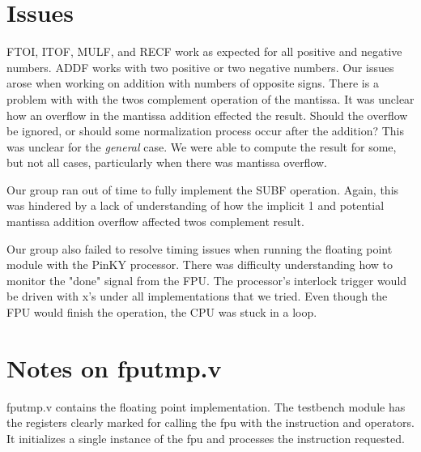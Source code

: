 \documentclass[conference]{IEEEtran}
\begin{document}
\section{Issues}
    FTOI, ITOF, MULF, and RECF work as expected  for all positive and negative numbers. ADDF works with two positive or two negative numbers. Our issues arose when working on addition with numbers of opposite signs. There is a problem with with the twos complement operation of the mantissa. It was unclear how an overflow in the mantissa addition effected the result. Should the overflow be ignored, or should some normalization process occur after the addition? This was unclear for the \textit{general} case. We were able to compute the result for some, but not all cases, particularly when there was mantissa overflow. 

    Our group ran out of time to fully implement the SUBF operation. Again, this was hindered by a lack of understanding of how the implicit 1 and potential mantissa addition overflow affected twos complement result. 
    
    Our group also failed to resolve timing issues when running the floating point module with the PinKY processor. There was difficulty understanding how to monitor the "done" signal from the FPU. The processor's interlock trigger would be driven with x's under all implementations that we tried. Even though the FPU would finish the operation, the CPU was stuck in a loop.

\section{Notes on fputmp.v}
    fputmp.v contains the floating point implementation. The testbench module has the registers clearly marked for calling the fpu with the instruction and operators. It initializes a single instance of the fpu and processes the instruction requested.
\end{document}
